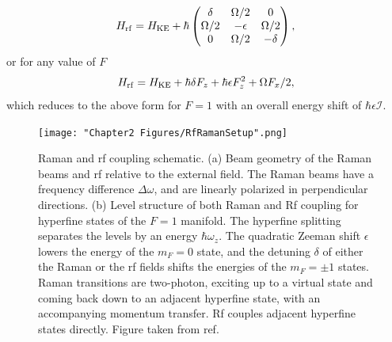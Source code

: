 \begin{equation}
H_{\rm rf} = H_{\rm KE} + \hbar
 \begin{pmatrix} \delta & \Omega/2  &  0  \\ 
\Omega/2 & -\epsilon &  \Omega/2 \\
 0 & \Omega/2  & -\delta  \\
 \end{pmatrix} \\,
\label{eqn:rfHam}
\end{equation}
or for any value of $F$
\begin{equation}
H_{\rm rf} = H_{\rm KE} + \hbar\delta F_z + \hbar \epsilon F^2_z + \Omega F_x/2,
\end{equation}
which reduces to the above form for $F=1$ with an overall energy shift of $\hbar\epsilon\mathcal{I}$. 

\begin{figure}
	\texttt{[image: "Chapter2 Figures/RfRamanSetup".png]}
\caption[Raman and rf coupling schematic]{Raman and rf coupling schematic. (a) Beam geometry of the Raman beams and rf relative to the external field. The Raman beams have a frequency difference $\Delta\omega$, and are linearly polarized in perpendicular directions. (b) Level structure of both Raman and Rf coupling for hyperfine states of the $F=1$ manifold. The hyperfine splitting separates  the levels by an energy $\hbar\omega_z$. The quadratic Zeeman shift $\epsilon$ lowers the energy of the $m_F=0$ state, and the detuning $\delta$ of either the Raman or the rf fields shifts the energies of the $m_F=\pm1$ states. Raman transitions are two-photon, exciting up to a virtual state and coming back down to an adjacent hyperfine state, with an accompanying momentum transfer. Rf couples adjacent hyperfine states directly. Figure taken from ref. \cite{Karina2012}}
\label{fig:RamanRfSchematic}
\end{figure}

